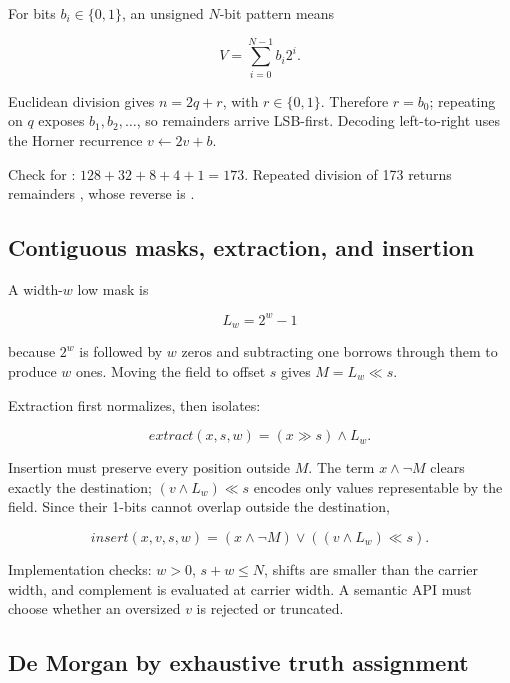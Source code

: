 \hypertarget{03-visual-computing-i-ch018-unsigned-positional-value-and-base-conversion}{}

For bits \(b_i\in\{0,1\}\), an unsigned \(N\)-bit pattern means

\[
V=\sum_{i=0}^{N-1}b_i2^i.
\]

Euclidean division gives \(n=2q+r\), with \(r\in\{0,1\}\). Therefore \(r=b_0\); repeating on \(q\) exposes \(b_1,b_2,\ldots\), so remainders arrive LSB-first. Decoding left-to-right uses the Horner recurrence \(v\leftarrow2v+b\).

Check for : \(128+32+8+4+1=173\). Repeated division of 173 returns remainders , whose reverse is .

\subsection{Contiguous masks, extraction, and insertion}\label{03-visual-computing-i-ch018-contiguous-masks-extraction-and-insertion}

\hypertarget{03-visual-computing-i-ch018-contiguous-masks-extraction-and-insertion}{}

A width-\(w\) low mask is

\[
L_w=2^w-1
\]

because \(2^w\) is  followed by \(w\) zeros and subtracting one borrows through them to produce \(w\) ones. Moving the field to offset \(s\) gives \(M=L_w\ll s\).

Extraction first normalizes, then isolates:

\[
extract(x,s,w)=(x\gg s)\land L_w.
\]

Insertion must preserve every position outside \(M\). The term \(x\land\neg M\) clears exactly the destination; \((v\land L_w)\ll s\) encodes only values representable by the field. Since their 1-bits cannot overlap outside the destination,

\[
insert(x,v,s,w)=(x\land\neg M)\lor((v\land L_w)\ll s).
\]

Implementation checks: \(w>0\), \(s+w\le N\), shifts are smaller than the carrier width, and complement is evaluated at carrier width. A semantic API must choose whether an oversized \(v\) is rejected or truncated.

\subsection{De Morgan by exhaustive truth assignment}\label{03-visual-computing-i-ch018-de-morgan-by-exhaustive-truth-assignment}

